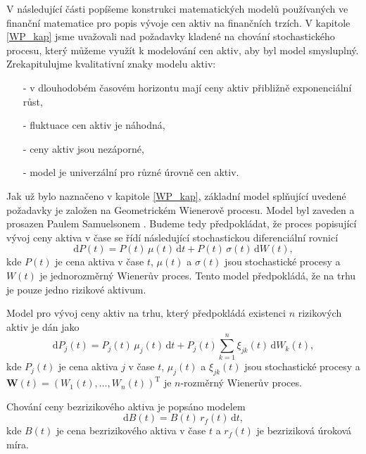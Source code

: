 \documentclass[a4paper,12pt]{report}
\theoremstyle{definition} \newtheorem{definice}[veta]{Definice}
\theoremstyle{remark}
\begin{document}
V následující části popíšeme konstrukci matematických modelů používaných ve finanční matematice pro popis vývoje cen aktiv na finančních trzích.
V kapitole \ref{WP_kap} jsme uvažovali nad požadavky kladené na chování stochastického procesu, který můžeme využít k modelování cen aktiv, aby byl model smysluplný.
Zrekapitulujme kvalitativní znaky modelu aktiv:
\begin{itemize}
\item[-] v dlouhodobém časovém horizontu mají ceny aktiv přibližně exponenciální růst,
\item[-] fluktuace cen aktiv je náhodná,
\item[-] ceny aktiv jsou nezáporné,
\item[-] model je univerzální pro různé úrovně cen aktiv.
\end{itemize}
Jak už bylo naznačeno v kapitole \ref{WP_kap}, základní model splňující uvedené požadavky je založen na Geometrickém Wienerově procesu. 
Model byl zaveden a prosazen Paulem Samuelsonem \cite{samuelson1965proof}.
Budeme tedy předpokládat, že proces popisující vývoj ceny aktiva v čase se řídí následující stochastickou diferenciální rovnicí %
\begin{equation}\label{risk_asset_model}
\mathrm{d}P(t)=P(t)\,\mu(t)\,\mathrm{d}t+P(t)\,\sigma(t)\,\mathrm{d}W(t),
\end{equation}
kde $P(t)$ je cena aktiva v čase $t$, $\mu(t)$ a $\sigma(t)$ jsou stochastické procesy a $W(t)$  je jednorozměrný Wienerův proces.
Tento model předpokládá, že na trhu je pouze jedno rizikové aktivum.

Model pro vývoj ceny aktiv na trhu, který předpokládá existenci $n$ rizikových aktiv je dán jako
\begin{equation}\label{multi_risk_asset_model}
\mathrm{d}P_j(t)=P_j(t)\,\mu_j(t)\,\mathrm{d}t+P_j(t)\sum_{k=1}^{n}\xi_{jk}(t)\,\mathrm{d}W_k(t),
\end{equation}
kde $P_j(t)$ je cena aktiva $j$ v čase $t$, $\mu_j(t)$ a $\xi_{jk}(t)$ jsou stochastické procesy a $\boldsymbol{W}(t)=(W_1(t),\dots,W_n(t))^\mathrm{T}$ je $n$-rozměrný Wienerův proces. 

Chování ceny bezrizikového aktiva je popsáno modelem
\begin{equation}\label{risk-free_asset_model}
\mathrm{d}B(t)=B(t)\,r_f(t)\,\mathrm{d}t,
\end{equation}
kde $B(t)$ je cena bezrizikového aktiva v čase $t$ a $r_f(t)$ je bezriziková úroková míra.
\end{document}
